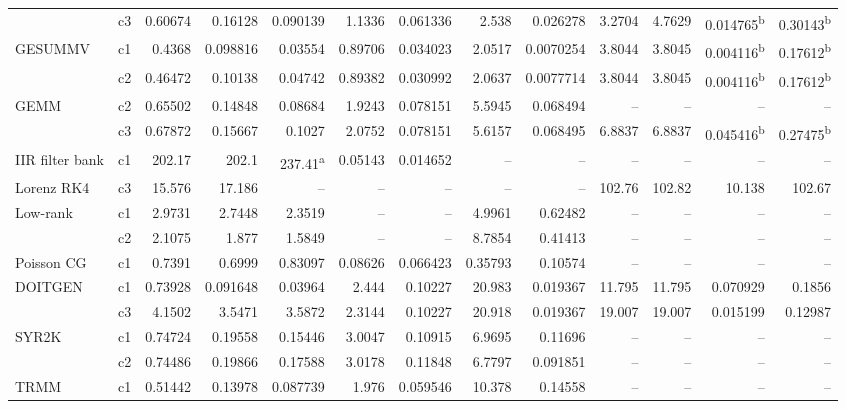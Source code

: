 \begin{table}[t]
{\begin{tabular*}{\textwidth}{@{\extracolsep{\fill}}llrrrrrrrrrrr@{}}
     & c3 & 0.60674 & 0.16128 & 0.090139 & 1.1336 & 0.061336 & 2.538 & 0.026278 & 3.2704 & 4.7629 & 0.014765\textsuperscript{b} & 0.30143\textsuperscript{b} \\
    \addlinespace[1.5pt]
    GESUMMV & c1 & 0.4368 & 0.098816 & 0.03554 & 0.89706 & 0.034023 & 2.0517 & 0.0070254 & 3.8044 & 3.8045 & 0.004116\textsuperscript{b} & 0.17612\textsuperscript{b} \\
     & c2 & 0.46472 & 0.10138 & 0.04742 & 0.89382 & 0.030992 & 2.0637 & 0.0077714 & 3.8044 & 3.8045 & 0.004116\textsuperscript{b} & 0.17612\textsuperscript{b} \\
    \addlinespace[1.5pt]
    GEMM & c2 & 0.65502 & 0.14848 & 0.08684 & 1.9243 & 0.078151 & 5.5945 & 0.068494 & -- & -- & -- & -- \\
     & c3 & 0.67872 & 0.15667 & 0.1027 & 2.0752 & 0.078151 & 5.6157 & 0.068495 & 6.8837 & 6.8837 & 0.045416\textsuperscript{b} & 0.27475\textsuperscript{b} \\
    \addlinespace[1.5pt]
    IIR filter bank & c1 & 202.17 & 202.1 & 237.41\textsuperscript{a} & 0.05143 & 0.014652 & -- & -- & -- & -- & -- & -- \\
    \addlinespace[1.5pt]
    Lorenz RK4 & c3 & 15.576 & 17.186 & -- & -- & -- & -- & -- & 102.76 & 102.82 & 10.138 & 102.67 \\
    \addlinespace[1.5pt]
    Low-rank & c1 & 2.9731 & 2.7448 & 2.3519 & -- & -- & 4.9961 & 0.62482 & -- & -- & -- & -- \\
     & c2 & 2.1075 & 1.877 & 1.5849 & -- & -- & 8.7854 & 0.41413 & -- & -- & -- & -- \\
    \addlinespace[1.5pt]
    Poisson CG & c1 & 0.7391 & 0.6999 & 0.83097 & 0.08626 & 0.066423 & 0.35793 & 0.10574 & -- & -- & -- & -- \\
    \addlinespace[1.5pt]
    DOITGEN & c1 & 0.73928 & 0.091648 & 0.03964 & 2.444 & 0.10227 & 20.983 & 0.019367 & 11.795 & 11.795 & 0.070929 & 0.1856 \\
     & c3 & 4.1502 & 3.5471 & 3.5872 & 2.3144 & 0.10227 & 20.918 & 0.019367 & 19.007 & 19.007 & 0.015199 & 0.12987 \\
    \addlinespace[1.5pt]
    SYR2K & c1 & 0.74724 & 0.19558 & 0.15446 & 3.0047 & 0.10915 & 6.9695 & 0.11696 & -- & -- & -- & -- \\
     & c2 & 0.74486 & 0.19866 & 0.17588 & 3.0178 & 0.11848 & 6.7797 & 0.091851 & -- & -- & -- & -- \\
    \addlinespace[1.5pt]
    TRMM & c1 & 0.51442 & 0.13978 & 0.087739 & 1.976 & 0.059546 & 10.378 & 0.14558 & -- & -- & -- & -- \\

\end{tabular*}}
\end{table}
